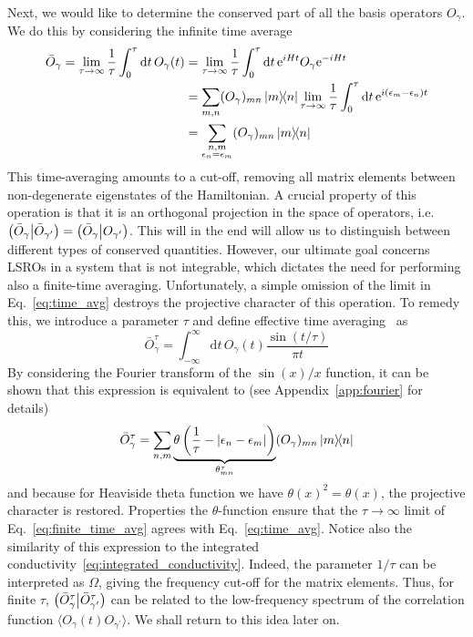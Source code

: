 Next, we would like to determine the conserved part of all the basis operators \(O_{\gamma}\). We do this
by considering the infinite time average 
\begin{align}
    \bar{O}_{\gamma} = \lim_{\tau\to\infty}\frac{1}{\tau} \int_0^{\tau} \mathrm{d}t\, O_{\gamma}(t) &= 
     \lim_{\tau\to\infty}\frac{1}{\tau} \int_0^{\tau} \mathrm{d}t\, \mathrm{e}^{i H t}O_{\gamma} \mathrm{e}^{-i H t} \nonumber\\
     &= \sum_{m,n} (O_{\gamma})_{mn}\ketbra{m}{n} \lim_{\tau\to\infty} \frac{1}{\tau} \int_0^{\tau} \mathrm{d}t \, \mathrm{e}^{i(\epsilon_m-\epsilon_n)t} \nonumber\\
    &= \sum_{\substack{n,m \\ \epsilon_n = \epsilon_m}} (O_{\gamma})_{mn}\ketbra{m}{n}
    \label{eq:time_avg}
\end{align}
This time-averaging amounts to a cut-off, removing all matrix elements between non-degenerate eigenstates
of the Hamiltonian. A crucial property of this operation is that it is an orthogonal projection
in the space of operators, i.e. \(\left(\bar{O}_{\gamma} \middle| \bar{O}_{\gamma^{\prime}}\right) = \left(\bar{O}_{\gamma} \middle| O_{\gamma^{\prime}}\right)\). This will
in the end will allow us to distinguish between different types of conserved quantities.
However, our ultimate goal concerns LSROs in a system that is not integrable, which dictates the
need for performing also a finite-time averaging. Unfortunately, a simple omission of the limit
in Eq.~\eqref{eq:time_avg} destroys the projective character of this operation. To remedy this,
we introduce a parameter \(\tau\) and define effective time averaging~\autocite{Mierzejewski2015}
as
\begin{equation}
    \bar{O}_{\gamma}^{\tau} = \int_{-\infty}^{\infty} \mathrm{d}t\, O_{\gamma}(t) \frac{\sin(t/\tau)}{\pi t}
\end{equation}
By considering the Fourier transform of the \(\sin(x)/x\) function, it can be shown that
this expression is equivalent to (see Appendix~\ref{app:fourier} for details)
\begin{equation}
    \bar{O}_{\gamma}^{\tau} = \sum_{n,m} \underbrace{\theta\left(\frac{1}{\tau} - |\epsilon_n - \epsilon_m|\right)}_{\theta_{mn}^{\tau}} (O_{\gamma})_{mn} \ketbra{m}{n}
\label{eq:finite_time_avg}
\end{equation}
and because for Heaviside theta function we have \(\theta(x)^2 = \theta(x)\), the projective character is restored. 
Properties the \(\theta\)-function ensure that the \(\tau\to\infty\) limit of Eq.~\eqref{eq:finite_time_avg}
agrees with Eq.~\eqref{eq:time_avg}. Notice also the similarity of this expression to the integrated conductivity~\eqref{eq:integrated_conductivity}.
Indeed, the parameter \(1/\tau\) can be interpreted as \(\Omega\), giving the frequency cut-off for the matrix elements.
Thus, for finite \(\tau\), \(\left(\bar{O}_{\gamma}^{\tau} \middle| \bar{O}_{\gamma^{\prime}}^{\tau}\right)\) can be related to the low-frequency spectrum of 
the correlation function \(\langle O_{\gamma}(t) O_{\gamma^{\prime}} \rangle\). We shall return to this idea later on.

